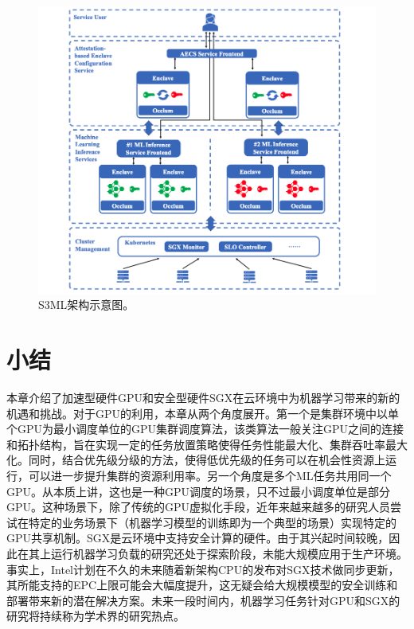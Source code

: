 \begin{figure}[h]
    \centerline{\includegraphics[width=\textwidth]{figures/s3ml-arch.png}}
    \caption{S3ML架构示意图。}
    \label{s3ml_arch}
\end{figure}

\section{小结}
本章介绍了加速型硬件GPU和安全型硬件SGX在云环境中为机器学习带来的新的机遇和挑战。对于GPU的利用，本章从两个角度展开。第一个是集群环境中以单个GPU为最小调度单位的GPU集群调度算法，该类算法一般关注GPU之间的连接和拓扑结构，旨在实现一定的任务放置策略使得任务性能最大化、集群吞吐率最大化。同时，结合优先级分级的方法，使得低优先级的任务可以在机会性资源上运行，可以进一步提升集群的资源利用率。另一个角度是多个ML任务共用同一个GPU。从本质上讲，这也是一种GPU调度的场景，只不过最小调度单位是部分GPU。这种场景下，除了传统的GPU虚拟化手段，近年来越来越多的研究人员尝试在特定的业务场景下（机器学习模型的训练即为一个典型的场景）实现特定的GPU共享机制。SGX是云环境中支持安全计算的硬件。由于其兴起时间较晚，因此在其上运行机器学习负载的研究还处于探索阶段，未能大规模应用于生产环境。事实上，Intel计划在不久的未来随着新架构CPU的发布对SGX技术做同步更新，其所能支持的EPC上限可能会大幅度提升，这无疑会给大规模模型的安全训练和部署带来新的潜在解决方案。未来一段时间内，机器学习任务针对GPU和SGX的研究将持续称为学术界的研究热点。
